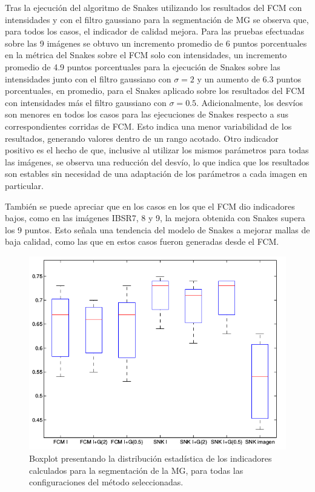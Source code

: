 Tras la ejecución del algoritmo de Snakes utilizando los resultados del FCM con intensidades y con el filtro gaussiano para la segmentación de MG se observa que, para todos los casos, el indicador de calidad mejora. Para las pruebas efectuadas sobre las 9 imágenes se obtuvo un incremento promedio de 6 puntos porcentuales en la métrica del Snakes sobre el FCM solo con intensidades, un incremento promedio de 4.9 puntos porcentuales para la ejecución de Snakes sobre las intensidades junto con el filtro gaussiano con $\sigma = 2$ y un aumento de 6.3 puntos porcentuales, en promedio, para el Snakes aplicado sobre los resultados del FCM con intensidades más el filtro gaussiano con $\sigma = 0.5$. Adicionalmente, los desvíos son menores en todos los casos para las ejecuciones de Snakes respecto a sus correspondientes corridas de FCM. Esto indica una menor variabilidad de los resultados, generando valores dentro de un rango acotado. Otro indicador positivo es el hecho de que, inclusive al utilizar los mismos parámetros para todas las imágenes, se observa una reducción del desvío, lo que indica que los resultados son estables sin necesidad de una adaptación de los parámetros a cada imagen en particular. 

También se puede apreciar que en los casos en los que el FCM dio indicadores bajos, como en las imágenes IBSR7, 8 y 9, la mejora obtenida con Snakes supera los 9 puntos. Esto señala una tendencia del modelo de Snakes a mejorar mallas de baja calidad, como las que en estos casos fueron generadas desde el FCM.

\begin{figure}[H]
	\centering
	\includegraphics[scale=0.5]{images/BoxPlotMG.png}
	\caption{Boxplot presentando la distribución estadística  de los indicadores calculados para la segmentación de la MG, para todas las configuraciones del método seleccionadas.
		}
	\label{fig:boxplotMG}
\end{figure}

